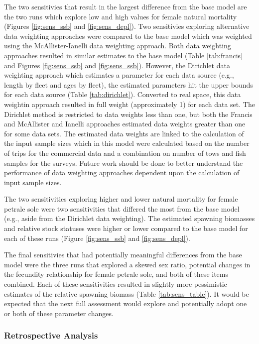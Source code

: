 \documentclass[12pt,]{article}
\begin{document}
The two sensitivies that result in the largest difference from the base
model are the two runs which explore low and high values for female
natural mortality (Figures \ref{fig:sens_ssb} and \ref{fig:sens_depl}).
Two sensitivies exploring alternative data weighting approaches were
compared to the base model which was weighted using the
McAllister-Ianelli data weighting approach. Both data weighting
approaches resulted in similar estimates to the base model (Table
\ref{tab:francis} and Figures \ref{fig:sens_ssb} and
\ref{fig:sens_ssb}). However, the Dirichlet data weighting approach
which estimates a parameter for each data source (e.g., length by fleet
and ages by fleet), the estimated parameters hit the upper bounds for
each data source (Table \ref{tab:dirichlet}). Converted to real space,
this data weightin approach resulted in full weight (approximately 1)
for each data set. The Dirichlet method is restricted to data weights
less than one, but both the Francis and McAllister and Ianelli
approaches estimated data weights greater than one for some data sets.
The estimated data weights are linked to the calculation of the input
sample sizes which in this model were calculated based on the number of
trips for the commercial data and a combination on number of tows and
fish samples for the surveys. Future work should be done to better
understand the performance of data weighting approaches dependent upon
the calculation of input sample sizes.

The two sensitivities exploring higher and lower natural mortality for
female petrale sole were two sensitivities that differed the most from
the base model (e.g., aside from the Dirichlet data weighting). The
estimated spawning biomasses and relative stock statuses were higher or
lower compared to the base model for each of these runs (Figure
\ref{fig:sens_ssb} and \ref{fig:sens_depl}).

The final sensitivies that had potentially meaningful differences from
the base model were the three runs that explored a skewed sex ratio,
potential changes in the fecundity relationship for female petrale sole,
and both of these items combined. Each of these sensitivities resulted
in slightly more pessimistic estimates of the relative spawning biomass
(Table \ref{tab:sens_table}). It would be expected that the next full
assessment would explore and potentially adopt one or both of these
parameter changes.

\subsubsection{Retrospective Analysis}\label{retrospective-analysis}
\end{document}

